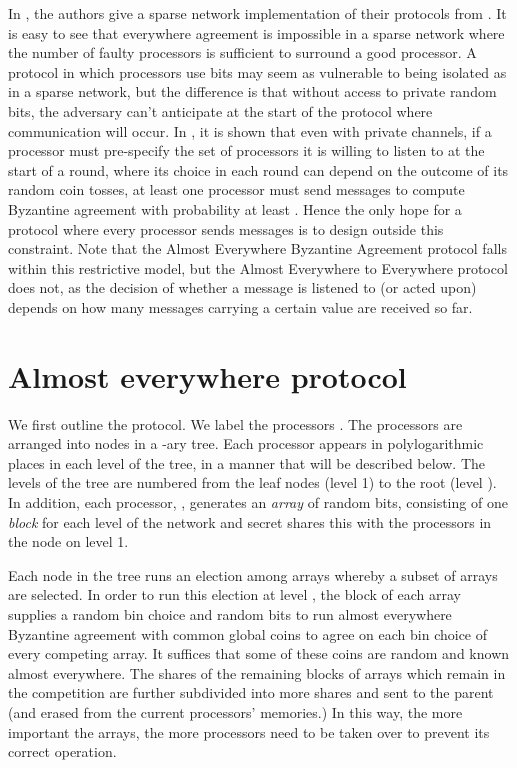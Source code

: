 \documentclass[letterpaper,11pt]{article}
\begin{document}
In \cite{KSSV2}, the authors give a sparse network implementation of their protocols from \cite{KSSV}.   It is easy to see that everywhere agreement is impossible in a sparse network where the number of faulty processors  is sufficient to surround  a good processor.  A protocol in which processors use  bits may seem as vulnerable to being isolated as in a sparse network, but the difference is that without access to private random bits, the adversary can't anticipate at the start of the protocol where communication will occur.   In \cite{HKK}, it is shown that even with private channels, if a processor must pre-specify the set of processors it is willing to listen to at the start of a round,  where its choice in each round can depend on the outcome of its random coin tosses, at least one processor must send  messages to compute Byzantine agreement with probability at least .  Hence the only hope for a protocol where every processor sends  messages is to design outside this constraint.  Note that the Almost Everywhere Byzantine Agreement protocol falls within this restrictive model, but the Almost Everywhere to Everywhere protocol does not, as the decision of whether a message is listened to  (or acted upon) depends on how many messages carrying a certain value are received so far. 

\section{Almost everywhere protocol} \label{s:aeprotocol}

We first outline the protocol.  We label the processors .  The processors are arranged into nodes in a -ary tree. Each processor appears in polylogarithmic places in each level of the tree, in a manner that will be described below. The levels of the tree are numbered from the leaf nodes (level 1) to the root (level ).  In addition, each processor, , generates an \emph{array} of random bits, consisting of one \emph{block} for each level of the network and secret shares this with the processors in the  node on level 1. 

Each node in the tree runs an election among  arrays whereby a subset of  arrays are selected.  In order to run this election at level ,
the  block of each array supplies a random bin choice and random bits to run almost everywhere Byzantine agreement with common global coins to agree on each bin choice of every competing array.  It suffices that some of these coins are random and known almost everywhere. The  shares of  the remaining blocks of arrays  which remain in the competition are further subdivided into more shares and sent to the parent  (and erased from the current processors'
memories.) In this way, the more important the arrays, the more processors  need to be taken over to prevent its correct operation.
\end{document}

